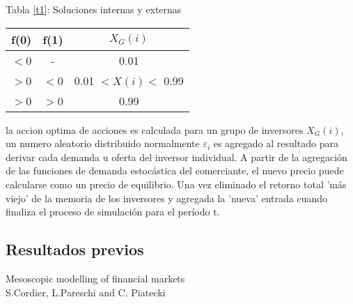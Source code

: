 \documentclass[12pt,a4paper]{article}
\begin{document}
\begin{center}
Tabla \ref{t1}: Soluciones internas y externas\\
\begin{tabular}{ccc}
\hline
f(0)&f(1)& $X_G(i)$\\
\hline
$<$0&-&0.01\\
\hline
$>$0&$<$0&0.01 $< X(i) <$ 0.99\\
\hline
$>$0&$>$0&0.99
\end{tabular}
\label{t1}
\end{center}
\quad la accion optima de acciones es calculada para un grupo de inversores $X_G(i)$, un numero aleatorio distribuido normalmente $\varepsilon_i$ es agregado al resultado para derivar cada demanda u oferta del inversor individual. A partir de la agregación de las funciones de demanda estocástica del comerciante, el nuevo precio puede calcularse como un precio de equilibrio. Una vez eliminado el retorno total 'más viejo' de la memoria de los inversores y agregada la 'nueva' entrada cuando finaliza el proceso de simulación para el período t.  
\subsection*{Resultados previos}
\quad
\newpage
\begin{center}
Mesoscopic modelling of financial markets\\
S.Cordier, L.Pareschi and C. Piatecki
\citep{cordier2009}
\end{center}
\end{document}
